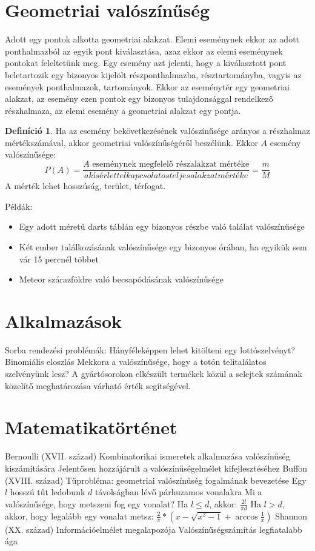 \documentclass[twoside,12pt]{report}
\theoremstyle{definition}
\newtheorem{definition}[theorem]{Definíció}
\begin{document}
\section{Geometriai valószínűség}
	Adott egy pontok alkotta geometriai alakzat. Elemi eseménynek ekkor az adott ponthalmazból az
	egyik pont kiválasztása, azaz ekkor az elemi eseménynek pontokat feleltetünk meg. Egy esemény
	azt jelenti, hogy a kiválasztott pont beletartozik egy bizonyos kijelölt részponthalmazba, résztartományba, vagyis az események ponthalmazok, tartományok. Ekkor az eseménytér egy geometriai
	alakzat, az esemény ezen pontok egy bizonyos tulajdonsággal rendelkező részhalmaza, az elemi
	esemény a geometriai alakzat egy pontja.
	\begin{definition}
		Ha az esemény bekövetkezésének valószínűsége arányos a részhalmaz mértékszámával,
		akkor geometriai valószínűségéről beszélünk. Ekkor $A$ esemény valószínűsége:
		\begin{equation*}
			P(A)=\frac{\text{$A$ eseménynek megfelelő részalakzat mértéke}}{a kísérlettel kapcsolatos teljes alakzat mértéke}=\frac{m}{M}
		\end{equation*}
		A mérték lehet hosszúság, terület, térfogat.
	\end{definition}
	Példák:
	\begin{itemize}
		\item Egy adott méretű darts táblán egy bizonyos részbe való találat valószínűsége
		\item Két ember találkozásának valószínűsége egy bizonyos órában, ha egyikük sem vár 15 percnél
		többet
		\item Meteor szárazföldre való becsapódásának valószínűsége
	\end{itemize}
\section{Alkalmazások}
	\begin{outline}
		\1 Sorba rendezési problémák:
			\2 Hányféleképpen lehet kitölteni egy lottószelvényt?
		\1 Binomiális eloszlás
			\2 Mekkora a valószínűsége, hogy a totón telitalálatos szelvényünk lesz?
			\2 A gyártósorokon elkészült termékek közül a selejtek számának közelítő meghatározása várható érték segítségével.
	\end{outline}
\section{Matematikatörténet}
	\begin{outline}
		\1 Bernoulli (XVII. század)
			\2 Kombinatorikai ismeretek alkalmazása valószínűség kiszámítására
			\2 Jelentősen hozzájárult a valószínűségelmélet kifejlesztéséhez
		\1 Buffon (XVIII. század)
			\2 Tűprobléma: geometriai valószínűség fogalmának bevezetése
			\2 Egy $l$ hosszú tűt ledobunk $d$ távolságban lévő párhuzamos vonalakra
				\3 Mi a valószínűsége, hogy metszeni fog egy vonalat?
				\3 Ha $l\le d$, akkor: $\frac{2l}{\pi d}$
				\3 Ha $l>d$, akkor, hogy legalább egy vonalat metsz: $\frac{2}{\pi}*\left(x-\sqrt{x^2-1}+\arccos\frac{1}{x}\right)$
		\1 Shannon (XX. század)
			\2 Információelmélet megalapozója
				\3 Valószínűségszámítás legfiatalabb ága
	\end{outline}
\end{document}
